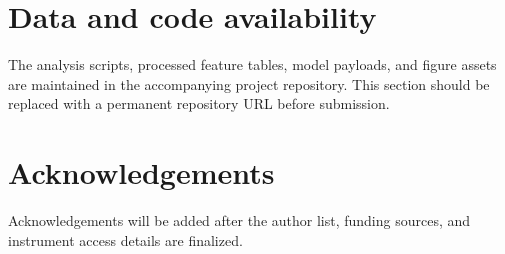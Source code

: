 \documentclass[11pt]{article}
\begin{document}
\section*{Data and code availability}
The analysis scripts, processed feature tables, model payloads, and figure assets are maintained in the accompanying project repository. This section should be replaced with a permanent repository URL before submission.

\section*{Acknowledgements}
Acknowledgements will be added after the author list, funding sources, and instrument access details are finalized.



\end{document}
